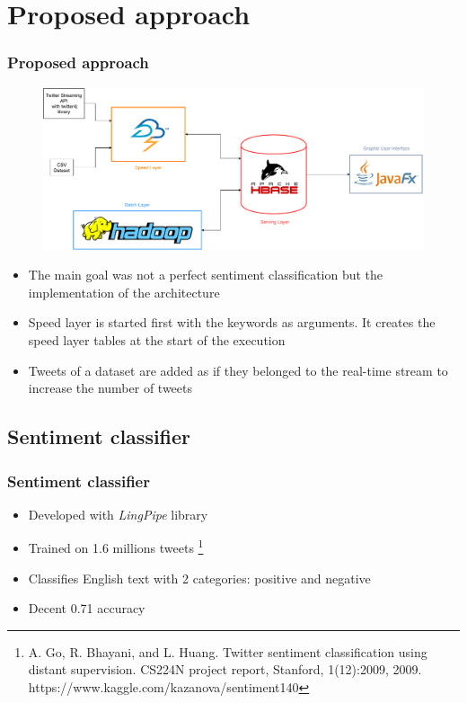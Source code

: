 \documentclass[xcolor=table, unknownkeysallowed]{beamer}
\begin{document}

\section{Proposed approach}

\begin{frame}
\frametitle{Proposed approach}
\begin{figure}
\centering
\includegraphics[width=0.85\linewidth]{img/lambda_architecture_diagram}
\label{fig:lambda_architecture_diagram}
\end{figure}
\begin{itemize}
\item The main goal was not a perfect sentiment classification but the implementation of the architecture
\item Speed layer is started first with the keywords as arguments. It creates the speed layer tables at the start of the execution
\item Tweets of a dataset are added as if they belonged to the real-time stream to increase the number of tweets
\end{itemize}
\end{frame}


\subsection{Sentiment classifier}

\begin{frame}
\frametitle{Sentiment classifier}
\begin{itemize}
\item Developed with \emph{LingPipe} library
\vspace{0.5cm}
\item Trained on 1.6 millions tweets \footnote{\tiny{A. Go, R. Bhayani, and L. Huang. Twitter sentiment classification using distant supervision. CS224N project report, Stanford, 1(12):2009, 2009. https://www.kaggle.com/kazanova/sentiment140}}
\vspace{0.5cm}
\item Classifies English text with 2 categories: positive and negative
\vspace{0.5cm}
\item Decent 0.71 accuracy
\end{itemize}
\end{frame}
\end{document}
